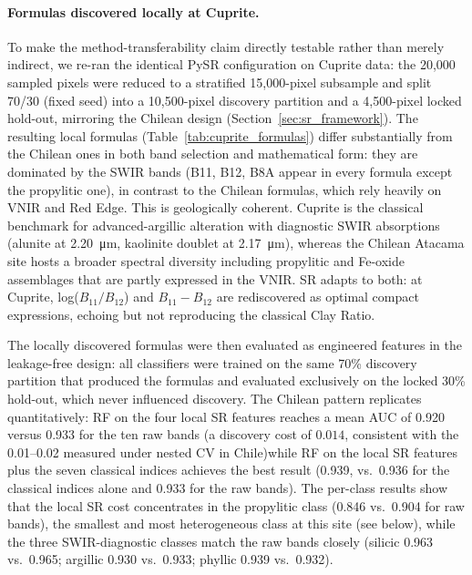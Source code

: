 \documentclass[preprint,authoryear,number]{elsarticle}
\begin{document}
\paragraph{Formulas discovered locally at Cuprite.} To make the method-transferability claim directly testable rather than merely indirect, we re-ran the identical PySR configuration on Cuprite data: the 20{,}000 sampled pixels were reduced to a stratified 15{,}000-pixel subsample and split 70/30 (fixed seed) into a 10{,}500-pixel discovery partition and a 4{,}500-pixel locked hold-out, mirroring the Chilean design (Section~\ref{sec:sr_framework}). The resulting local formulas (Table~\ref{tab:cuprite_formulas}) differ substantially from the Chilean ones in both band selection and mathematical form: they are dominated by the SWIR bands (B11, B12, B8A appear in every formula except the propylitic one), in contrast to the Chilean formulas, which rely heavily on VNIR and Red Edge. This is geologically coherent. Cuprite is the classical benchmark for advanced-argillic alteration with diagnostic SWIR absorptions (alunite at \SI{2.20}{\micro\meter}, kaolinite doublet at \SI{2.17}{\micro\meter}), whereas the Chilean Atacama site hosts a broader spectral diversity including propylitic and Fe-oxide assemblages that are partly expressed in the VNIR. SR adapts to both: at Cuprite, log($B_{11}/B_{12}$) and $B_{11} - B_{12}$ are rediscovered as optimal compact expressions, echoing but not reproducing the classical Clay Ratio.

The locally discovered formulas were then evaluated as engineered features in the leakage-free design: all classifiers were trained on the same 70\% discovery partition that produced the formulas and evaluated exclusively on the locked 30\% hold-out, which never influenced discovery. The Chilean pattern replicates quantitatively: RF on the four local SR features reaches a mean AUC of 0.920 versus 0.933 for the ten raw bands (a discovery cost of $0.014$, consistent with the 0.01--0.02 measured under nested CV in Chile)while RF on the local SR features plus the seven classical indices achieves the best result (0.939, vs.\ 0.936 for the classical indices alone and 0.933 for the raw bands). The per-class results show that the local SR cost concentrates in the propylitic class (0.846 vs.\ 0.904 for raw bands), the smallest and most heterogeneous class at this site (see below), while the three SWIR-diagnostic classes match the raw bands closely (silicic 0.963 vs.\ 0.965; argillic 0.930 vs.\ 0.933; phyllic 0.939 vs.\ 0.932).
\end{document}

